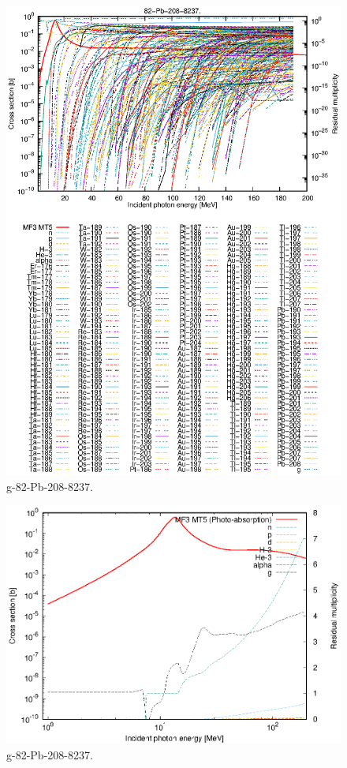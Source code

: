 \begin{figure}
 \includegraphics[width=\linewidth]{eps/g_82-Pb-208_8237.eps}
  \caption{g-82-Pb-208-8237.}
\end{figure}
\newpage \clearpage

\begin{figure}
 \includegraphics[width=\linewidth]{eps-log/g_82-Pb-208_8237.eps}
 \caption{g-82-Pb-208-8237.}
\end{figure}
\newpage \clearpage

